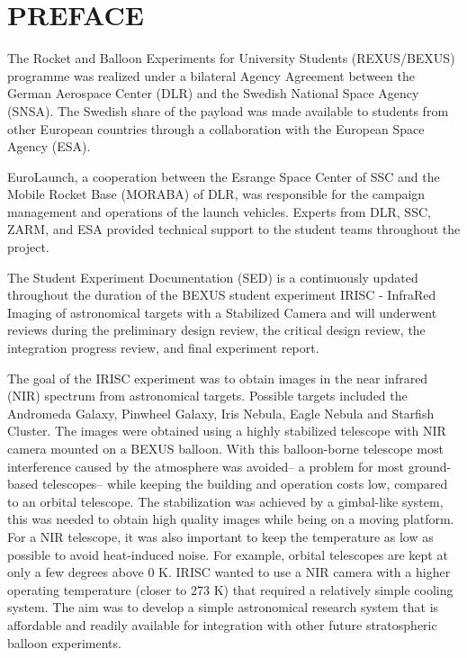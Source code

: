 \section*{PREFACE} \markboth{}{}

The Rocket and Balloon Experiments for University Students (REXUS/BEXUS) programme was realized under a bilateral Agency Agreement between the German Aerospace Center (DLR) and the Swedish National Space Agency (SNSA). The Swedish share of the
payload was made available to students from other European countries through a collaboration with the European Space Agency (ESA).

EuroLaunch, a cooperation between the Esrange Space Center of SSC and the Mobile Rocket Base (MORABA) of DLR, was responsible for the campaign management and operations of the launch vehicles. Experts from DLR, SSC, ZARM, and ESA provided
technical support to the student teams throughout the project.

The Student Experiment Documentation (SED) is a continuously updated throughout the duration of the  BEXUS student experiment IRISC - InfraRed Imaging of astronomical targets with a Stabilized Camera and will underwent reviews during the preliminary design review, the critical design review, the integration progress review, and final experiment report.

The goal of the IRISC experiment was to obtain images in the near infrared (NIR) spectrum from astronomical targets. Possible targets included the Andromeda Galaxy, Pinwheel Galaxy, Iris Nebula, Eagle Nebula and Starfish Cluster. The images were obtained using a highly stabilized telescope with NIR camera mounted on a BEXUS balloon. With this balloon-borne telescope most interference caused by the atmosphere was avoided-- a problem for most ground-based telescopes-- while keeping the building and operation costs low, compared to an orbital telescope. The stabilization was achieved by a gimbal-like system, this was needed to obtain high quality images while being on a moving platform. For a NIR telescope, it was also important to keep the temperature as low as possible to avoid heat-induced noise. For example, orbital telescopes are kept at only a few degrees above 0 K. IRISC wanted to use a NIR camera with a higher operating temperature (closer to 273 K) that required a relatively simple cooling system. The aim was to develop a simple astronomical research system that is affordable and readily available for integration with other future stratospheric balloon experiments. 
